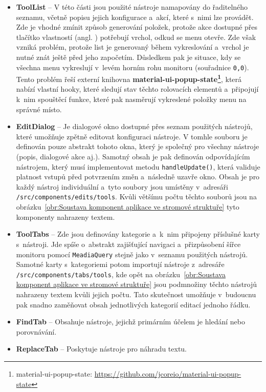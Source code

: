 \begin{itemize}
    \item \textbf{ToolList} -- V této části jsou použité nástroje namapovány do řaditelného seznamu, včetně popisu jejich konfigurace a~akcí, které s~nimi lze provádět. Zde je vhodné zmínit způsob generování položek, protože akce dostupné přes tlačítko vlastností (angl. ) potřebují vrchol, odkud se menu otevře. Zde však vzniká problém, protože list je generovaný během vykreslování a~vrchol je nutné znát ještě před jeho započetím. Důsledkem pak je situace, kdy se všechna menu vykreslují v~levém horním rohu monitoru (souřadnice \texttt{0,0}). Tento problém řeší externí knihovna \textbf{material-ui-popup-state\footnote{material-ui-popup-state: \url{https://github.com/jcoreio/material-ui-popup-state}}}, která nabízí vlastní hooky, které sledují stav těchto rolovacích elementů a~připojují k~nim spouštěcí funkce, které pak nasměrují vykreslené položky menu na správné místo.
    \item \textbf{EditDialog} -- Je dialogové okno dostupné přes seznam použitých nástrojů, které umožňuje zpětně editovat konfiguraci nástroje. V tomhle souboru je definován pouze abstrakt tohoto okna, který je společný pro všechny nástroje (popis, dialogové akce aj.). Samotný obsah je pak definován odpovídajícím nástrojem, který musí implementovat metodu \texttt{handleUpdate()}, která validuje platnost vstupů před potvrzením změn a~následně uzavře okno. Obsah je pro každý nástroj individuální a~tyto soubory jsou umístěny v~adresáři \texttt{/src/components/edits/tools}. Kvůli většímu počtu těchto souborů jsou na obrázku~\ref{obr:Soustava komponent aplikace ve stromové struktuře} tyto komponenty nahrazeny textem.
    \item \textbf{ToolTabs} -- Zde jsou definovány kategorie a~k~nim připojeny příslušné karty s~nástroji. Jde spíše o~abstrakt zajišťující navigaci a~přizpůsobení šířce monitoru pomocí \texttt{MeadiaQuery} stejně jako v~seznamu použitých nástrojů. Samotné karty s~kategoriemi potom importují nástroje z~adresáře \texttt{/src/components/tabs/tools}, kde opět na obrázku~\ref{obr:Soustava komponent aplikace ve stromové struktuře} jsou podmnožiny těchto nástrojů nahrazeny textem kvůli jejich počtu. Tato skutečnost umožňuje v~budoucnu pak snadno zaměňovat obsah jednotlivých kategorií editací jednoho řádku.
    \item \textbf{FindTab} -- Obsahuje nástroje, jejichž primárním účelem je hledání nebo porovnávání.
    \item \textbf{ReplaceTab} -- Poskytuje nástroje pro náhradu textu.

\end{itemize}
